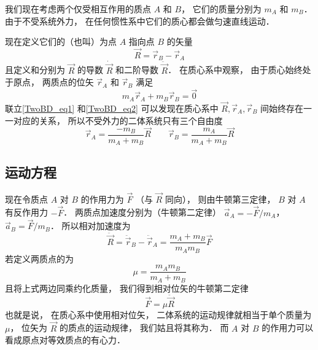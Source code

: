 

我们现在考虑两个仅受相互作用的质点 $A$ 和 $B$， 它们的质量分别为 $m_A$ 和 $m_B$． 由于不受系统外力， 在任何惯性系中它们的质心都会做匀速直线运动．%

现在定义它们的（也叫）为点 $A$ 指向点 $B$ 的矢量
\begin{equation}\label{TwoBD_eq1}
\vec R = \vec r_B - \vec r_A
\end{equation}
且定义和分别为 $\vec R$ 的导数 $\dot{\vec R}$ 和二阶导数 $\ddot{\vec R}$．
在质心系中观察， 由于质心始终处于原点， 两质点的位矢 $\vec r_A$ 和 $\vec r_B$ 满足
\begin{equation}\label{TwoBD_eq2}
m_A \vec r_A + m_B \vec r_B = \vec 0
\end{equation}
联立\autoref{TwoBD_eq1} 和\autoref{TwoBD_eq2} 可以发现在质心系中 $\vec R, \vec r_A, \vec r_B$ 间始终存在一一对应的关系， 所以不受外力的二体系统只有三个自由度
\begin{equation}\label{TwoBD_eq3}
\vec r_A = \frac{-m_B}{m_A + m_B} \vec R \qquad \vec r_B = \frac{m_A}{m_A + m_B} \vec R
\end{equation}

\subsection{运动方程}

现在令质点 $A$ 对 $B$ 的作用力为 $\vec F$ （与 $\vec R$ 同向）， 则由牛顿第三定律， $B$ 对 $A$ 有反作用力 $- \vec F$． 两质点加速度分别为（牛顿第二定律） $\vec a_A =  -\vec F/m_A$， $\vec a_B =  \vec F/m_B$． 所以相对加速度为
\begin{equation}
\ddot{\vec R} = \ddot{\vec r}_B - \ddot{\vec r}_A = \frac{m_A+m_B}{m_Am_B} \vec F
\end{equation}
若定义两质点的为
\begin{equation}
\mu = \frac{m_A m_B}{m_A + m_B}
\end{equation}
且将上式两边同乘约化质量， 我们得到相对位矢的牛顿第二定律
\begin{equation}\label{TwoBD_eq6}
\vec F = \mu\ddot{\vec R}
\end{equation}
也就是说， 在质心系中使用相对位矢， 二体系统的运动规律就相当于单个质量为 $\mu$， 位矢为 $\vec R$ 的质点的运动规律， 我们姑且将其称为． 而 $A$ 对 $B$ 的作用力可以看成原点对等效质点的有心力．

